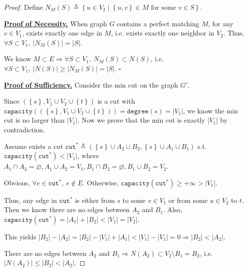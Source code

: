 \documentclass{article}
\newcommand{\whiteqed}{\hfill $\square$\par}
\newcommand{\set}[1]{\left\{#1\right\}}
\begin{document}
\begin{proof}
    Define $N_M(S)\triangleq\set{u\in V_2\mid \set{u,v}\in M\text{ for some }v\in S}.$
    
    \hspace{1.3em}
    \underline{\textbf{Proof of Necessity.}} When graph $G$ contains a perfect matching $M$, for any $v\in V_1$, exists exactly one edge in $M$, i.e. exists exactly one neighbor in $V_2$. Thus, $\forall S\subset V_1,\ |N_M(S)|=|S|$.
    
    \hspace{1.3em}
    We know $M\subset E\Longrightarrow \forall S\subset V_1,\ N_M(S)\subset N(S)$, i.e. $\forall S\subset V_1,\ |N(S)|\geq|N_M(S)|=|S|.$ \whiteqed
    
    \vspace{1em} \hspace{1.3em}
    \underline{\textbf{Proof of Sufficiency.}} Consider the min cut on the graph $G'$.
    
    \hspace{1.3em}
    Since $(\set{s},V_1\cup V_2\cup\set{t})$ is a cut with $\mathtt{capacity}\left((\set{s},V_1\cup V_2\cup\set{t})\right)=\mathtt{degree}(s)=|V_1|$, we know the min cut is no larger than $|V_1|$. Now we prove that the min cut is exactly $|V_1|$ by contradiction.
    
    \hspace{1.3em}
    Assume exists a cut $\mathtt{cut}^*\triangleq(\set{s}\cup A_2\cup B_2,\set{s}\cup A_1\cup B_1)$ s.t. $\mathtt{capacity}(\mathtt{cut}^*)<|V_1|$, where $A_1\cap A_2=\varnothing, A_1\cup A_2=V_1, B_1\cap B_2=\varnothing, B_1\cup B_2=V_2$. 
    
    \hspace{1.3em}
    Obvious, $\forall e\in\mathtt{cut}^*,\ e\notin E$. Otherwise, $\mathtt{capacity}(\mathtt{cut}^*)\geq+\infty>|V_1|$.
    
    \hspace{1.3em}
    Thus, any edge in $\mathtt{cut}^*$ is either from $s$ to some $v\in V_1$ or from some $u\in V_2$ to $t$. Then we know there are no edges between $A_2$ and $B_1$. Also, $\mathtt{capacity}(\mathtt{cut}^*)=|A_1|+|B_2|<|V_1|=|V_2|$.
    
    \hspace{1.3em}
    This yields $|B_2|-|A_2| = |B_2|-|V_1|+|A_1| < |V_1|-|V_1|=0\Longrightarrow |B_2|<|A_2|.$ 
    
    \hspace{1.3em}
    There are no edges between $A_2$ and $B_1\Longrightarrow N(A_2)\subset V_2\setminus B_1=B_2$, i.e. $|N(A_2)|\le|B_2|<|A_2|$.
    

\end{proof}
\end{document}
